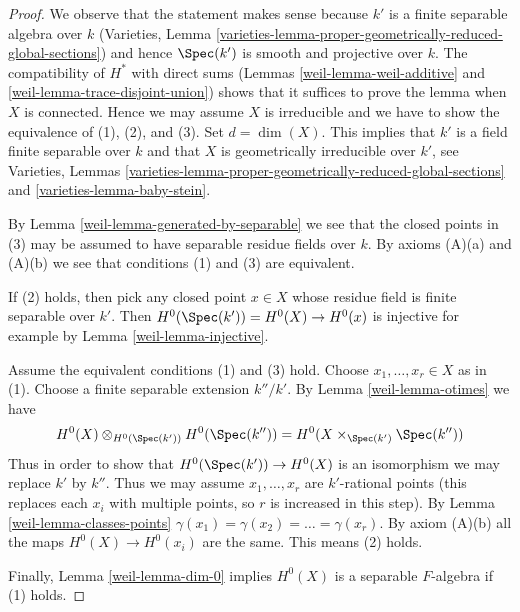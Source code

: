 \begin{proof}

We observe that the statement makes sense because $k'$ is a finite separable
algebra over $k$ (Varieties, Lemma
\ref{varieties-lemma-proper-geometrically-reduced-global-sections})
and hence $\Spec(k')$ is smooth and projective over $k$.
The compatibility of $H^*$ with direct sums
(Lemmas \ref{weil-lemma-weil-additive} and \ref{weil-lemma-trace-disjoint-union})
shows that it suffices to prove the lemma when $X$ is connected.
Hence we may assume $X$ is irreducible and we have to show the
equivalence of (1), (2), and (3). Set $d = \dim(X)$.
This implies that $k'$ is a field finite separable
over $k$ and that $X$ is geometrically irreducible over $k'$, see
Varieties, Lemmas
\ref{varieties-lemma-proper-geometrically-reduced-global-sections} and
\ref{varieties-lemma-baby-stein}.

\medskip\noindent
By Lemma \ref{weil-lemma-generated-by-separable} we see that the closed
points in (3) may be assumed to have separable residue fields over $k$.
By axioms (A)(a) and (A)(b) we see that conditions (1) and (3) are equivalent.

\medskip\noindent
If (2) holds, then pick any closed point $x \in X$ whose residue field
is finite separable over $k'$. Then
$H^0(\Spec(k')) = H^0(X) \to H^0(x)$ is injective for example by
Lemma \ref{weil-lemma-injective}.

\medskip\noindent
Assume the equivalent conditions (1) and (3) hold. Choose
$x_1, \ldots, x_r \in X$ as in (1). Choose a finite separable
extension $k''/k'$. By Lemma \ref{weil-lemma-otimes} we have
$$
H^0(X) \otimes_{H^0(\Spec(k'))} H^0(\Spec(k'')) =
H^0(X \times_{\Spec(k')} \Spec(k''))
$$
Thus in order to show that
$H^0(\Spec(k')) \to H^0(X)$ is an isomorphism
we may replace $k'$ by $k''$. Thus we may assume $x_1, \ldots, x_r$
are $k'$-rational points (this replaces each $x_i$ with multiple
points, so $r$ is increased in this step). By Lemma \ref{weil-lemma-classes-points}
$\gamma(x_1) = \gamma(x_2) = \ldots = \gamma(x_r)$.
By axiom (A)(b) all the maps $H^0(X) \to H^0(x_i)$
are the same. This means (2) holds.

\medskip\noindent
Finally, Lemma \ref{weil-lemma-dim-0} implies
$H^0(X)$ is a separable $F$-algebra if (1) holds.
\end{proof}

